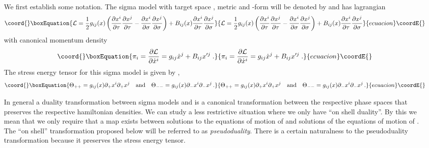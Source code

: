 \documentclass[a4paper,12pt]{article}
\providecommand{\Btil}{\widetilde{B}}
\providecommand{\Mtil}{\widetilde{M}}
\providecommand{\dminus}{\partial_{-}}
\providecommand{\dplus}{\partial_{+}}
\providecommand{\gtil}{\tilde{g}}
\providecommand{\half}{\frac{1}{2}}
\begin{document}
We first establish some
notation.  The sigma model with target space \coordHE{}, metric \coordHE{} and
\coordHE{}-form \coordHE{} will be denoted by \coordHE{} and has lagrangian
\begin{equation}\coord{}\boxEquation{
    \mathcal{L} = \half g_{ij}(x)
    \left(
    \frac{\partial x^{i}}{\partial \tau}
    \frac{\partial x^{j}}{\partial \tau}
    -\frac{\partial x^{i}}{\partial \sigma}
    \frac{\partial x^{j}}{\partial \sigma}
    \right) +
    B_{ij}(x)
    \frac{\partial x^{i}}{\partial \tau}
    \frac{\partial x^{j}}{\partial \sigma}
    \label{eq:lag}
}{
    \mathcal{L} = \half g_{ij}(x)
    \left(
    \frac{\partial x^{i}}{\partial \tau}
    \frac{\partial x^{j}}{\partial \tau}
    -\frac{\partial x^{i}}{\partial \sigma}
    \frac{\partial x^{j}}{\partial \sigma}
    \right) +
    B_{ij}(x)
    \frac{\partial x^{i}}{\partial \tau}
    \frac{\partial x^{j}}{\partial \sigma}
    }{ecuacion}\coordE{}\end{equation}
with canonical momentum density
\begin{equation}\coord{}\boxEquation{
    \pi_{i}= \frac{\partial\mathcal{L}}{\partial \dot{x}^{i}} =
    g_{ij}\dot{x}^{j} + B_{ij}x'^{j}\;.
    \label{eq:canmomentum}
}{
    \pi_{i}= \frac{\partial\mathcal{L}}{\partial \dot{x}^{i}} =
    g_{ij}\dot{x}^{j} + B_{ij}x'^{j}\;.
    }{ecuacion}\coordE{}\end{equation}
The stress energy tensor for this sigma model is given by
\coordHE{},
\begin{equation}\coord{}\boxEquation{
    \Theta_{++}= g_{ij}(x) \dplus x^{i} \dplus x^{j} \quad\mbox{and}\quad
    \Theta_{--}= g_{ij}(x) \dminus x^{i} \dminus x^{j}\,.
    \label{eq:Tmunu}
}{
    \Theta_{++}= g_{ij}(x) \dplus x^{i} \dplus x^{j} \quad\mbox{and}\quad
    \Theta_{--}= g_{ij}(x) \dminus x^{i} \dminus x^{j}\,.
    }{ecuacion}\coordE{}\end{equation}

In general a duality transformation between sigma models \coordHE{} and
\myHighlight{$(\Mtil,\gtil,\Btil)$}\coordHE{} is a canonical transformation between the
respective phase spaces that preserves the respective hamiltonian
densities.  We can study a less restrictive situation where we only
have ``on shell duality''.  By this we mean that we only require that
a map exists between solutions to the equations of motion of \coordHE{}
and solutions of the equations of motion of \myHighlight{$(\Mtil,\gtil,\Btil)$}\coordHE{}. 
The ``on shell'' transformation proposed below will be
referred to as \emph{pseudoduality}.  There is a certain naturalness
to the pseudoduality transformation because it preserves the stress
energy tensor.
\end{document}
